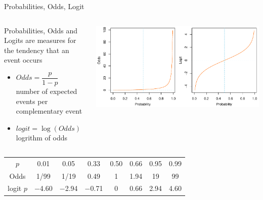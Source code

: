 \documentclass[aspectratio=169]{beamer}
\begin{document}
\begin{frame}{Probabilities, Odds, Logit}
  \begin{columns}
    \begin{column}{.35\textwidth}
\small
  Probabilities, Odds and Logits are measures for the tendency that an event
  occurs
  \begin{itemize}
    \item $Odds = \dfrac{p}{1 - p}$\\
      number of expected events per complementary event
    \item $logit = \log(Odds)$\\
      logrithm of odds
  \end{itemize} 
    \end{column}
    \begin{column}{.65\textwidth}
\includegraphics[scale=.55]{../figures/oddslogit}
    \end{column}
  \end{columns}
  \begin{center}
\begin{tabular}{|cccccccc|}
\hline
$p$       & 0.01    & 0.05 & 0.33 & 0.50 & 0.66 & 0.95 & 0.99 \\
Odds        & 1/99    & 1/19 & 0.49 & 1 & 1.94 & 19 & 99 \\
logit $p$ & $-$4.60 & $-$2.94 & $-$0.71 & 0 & 0.66 & 2.94 & 4.60 \\
\hline
\end{tabular}
  \end{center}
\end{frame}
\end{document}
